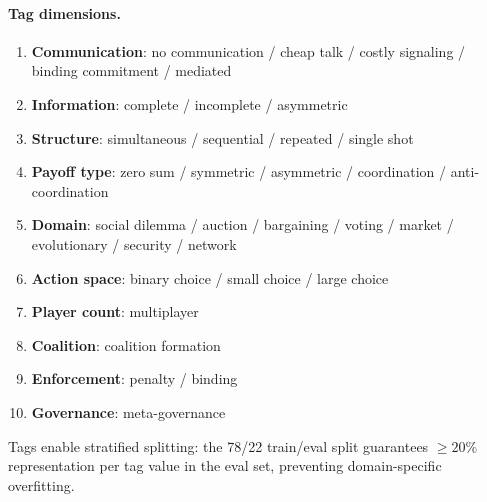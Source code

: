 \paragraph{Tag dimensions.}
\begin{enumerate}[nosep]
\item \textbf{Communication}: no communication / cheap talk / costly signaling / binding commitment / mediated
\item \textbf{Information}: complete / incomplete / asymmetric
\item \textbf{Structure}: simultaneous / sequential / repeated / single shot
\item \textbf{Payoff type}: zero sum / symmetric / asymmetric / coordination / anti-coordination
\item \textbf{Domain}: social dilemma / auction / bargaining / voting / market / evolutionary / security / network
\item \textbf{Action space}: binary choice / small choice / large choice
\item \textbf{Player count}: multiplayer
\item \textbf{Coalition}: coalition formation
\item \textbf{Enforcement}: penalty / binding
\item \textbf{Governance}: meta-governance
\end{enumerate}

Tags enable stratified splitting: the 78/22 train/eval split guarantees
$\geq 20\%$ representation per tag value in the eval set, preventing
domain-specific overfitting.
